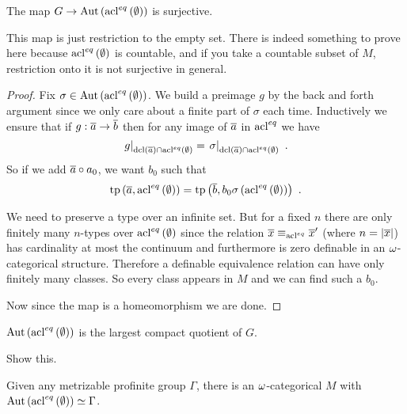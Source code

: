\documentclass{amsart}
\begin{document}
\begin{lem}
The map $G\rightarrow \operatorname{Aut}\left( \operatorname{acl}^{eq}\left( \emptyset \right) \right)$ is surjective.
\end{lem}

This map is just restriction to the empty set. 
There is indeed something to prove here because
$\operatorname{acl}^{eq}\left( \emptyset \right)$ is countable, and if you take a
countable subset of $M$, restriction onto it is not surjective in general.

\begin{proof}
Fix $\sigma \in \operatorname{Aut}\left( \operatorname{acl}^{eq}\left( \emptyset \right) \right)$. We build a preimage
$g$ by the back and forth argument since we only care about a finite part of $\sigma$ each
time. Inductively we ensure that if $g:\overline{a}\rightarrow \overline{b}$ then for
any image of $\overline{a}$ in $\operatorname{acl}^{eq}$ we have
\begin{equation}
\left.g \right\vert_{\operatorname{dcl}\left( \overline{a} \right) \cap \operatorname{acl}^{eq}\left( \emptyset \right)} = 
\left.\sigma \right\vert_{\operatorname{dcl}\left( \overline{a} \right) \cap \operatorname{acl}^{eq}\left( \emptyset \right)}
\ .
\end{equation}
So if we add $\overline{a}\circ a_0$, we want $b_0$ such that
\begin{equation}
\operatorname{tp}\left( \overline{a} , \operatorname{acl}^{eq}\left( \emptyset \right) \right) = 
\operatorname{tp}\left( \overline{b} , b_0 \sigma\left( \operatorname{acl}^{eq}\left( \emptyset \right) \right) \right) 
\ .
\end{equation}

We need to preserve a type over an infinite set. But for a fixed $n$ there are only
finitely many $n$-types over $\operatorname{acl}^{eq}\left( \emptyset \right)$ since the relation
$\overline{x} \equiv_{\operatorname{acl}^{eq}} \overline{x}'$ (where $n = \left| \overline{x} \right|$)
has cardinality at most the continuum and furthermore is zero definable in an
$\omega$-categorical structure. Therefore a definable equivalence relation can have only
finitely many classes. So every class appears in $M$ and we can find such a $b_0$. 

Now since the map is a homeomorphism we are done.
\end{proof}

\begin{prop}
$\operatorname{Aut}\left( \operatorname{acl}^{eq}\left( \emptyset \right) \right)$ is the largest compact quotient of
$G$. 
\end{prop}

\begin{exr}
Show this.
\end{exr}

\begin{prop}
Given any metrizable profinite group $\Gamma$, there is an $\omega$-categorical $M$ with
$\operatorname{Aut}\left( \operatorname{acl}^{eq}\left( \emptyset \right) \right)\simeq\Gamma$.
\end{prop}
\end{document}
